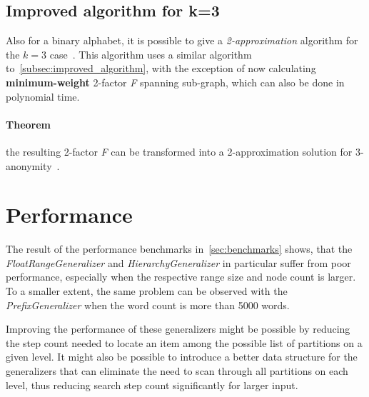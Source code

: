 \subsection{Improved algorithm for k=3}

Also for a binary alphabet, it is possible to give a \textit{2-approximation} algorithm for the \(k=3\) case~\cite{aggarwal}. This algorithm uses a similar algorithm to~\ref{subsec:improved_algorithm}, with the exception of now calculating \textbf{minimum-weight} 2-factor \textit{F} spanning sub-graph, which can also be done in polynomial time.

\paragraph{Theorem} the resulting 2-factor \textit{F} can be transformed into a 2-approximation solution for 3-anonymity~\cite{aggarwal}.


\section{Performance}

The result of the performance benchmarks in~\ref{sec:benchmarks} shows, that the \textit{FloatRangeGeneralizer} and \textit{HierarchyGeneralizer} in particular suffer from poor performance, especially when the respective range size and node count is larger. To a smaller extent, the same problem can be observed with the \textit{PrefixGeneralizer} when the word count is more than 5000 words.

Improving the performance of these generalizers might be possible by reducing the step count needed to locate an item among the possible list of partitions on a given level. It might also be possible to introduce a better data structure for the generalizers that can eliminate the need to scan through all partitions on each level, thus reducing search step count significantly for larger input.